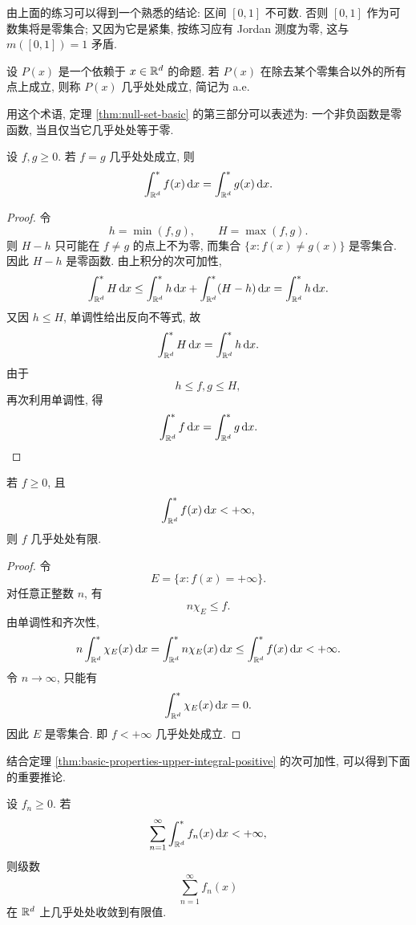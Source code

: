 由上面的练习可以得到一个熟悉的结论: 区间 \([0,1]\) 不可数. 否则 \([0,1]\) 作为可数集将是零集合; 又因为它是紧集, 按练习应有 Jordan 测度为零, 这与 \(m([0,1])=1\) 矛盾.

\begin{defn}[几乎处处]
	\label{def:almost-everywhere}
	设 \(P(x)\) 是一个依赖于 \(x\in\mathbb{R}^d\) 的命题. 若 \(P(x)\) 在除去某个零集合以外的所有点上成立, 则称 \(P(x)\) 几乎处处成立, 简记为 a.e.
\end{defn}

用这个术语, 定理 \ref{thm:null-set-basic} 的第三部分可以表述为: 一个非负函数是零函数, 当且仅当它几乎处处等于零.

\begin{thm}\label{thm:ae-equal-same-upper-integral}
	设 \(f,g\geq0\). 若 \(f=g\) 几乎处处成立, 则
	\[
	\int_{\mathbb{R}^d}^{*}f(x)\,\dd x
	=
	\int_{\mathbb{R}^d}^{*}g(x)\,\dd x.
	\]
\end{thm}

\begin{proof}
	令
	\[
	h=\min(f,g),
	\qquad
	H=\max(f,g).
	\]
	则 \(H-h\) 只可能在 \(f\neq g\) 的点上不为零, 而集合 \(\{x:f(x)\neq g(x)\}\) 是零集合. 因此 \(H-h\) 是零函数. 由上积分的次可加性,
	\[
	\int_{\mathbb{R}^d}^{*}H\,\dd x
	\leq
	\int_{\mathbb{R}^d}^{*}h\,\dd x
	+
	\int_{\mathbb{R}^d}^{*}(H-h)\,\dd x
	=
	\int_{\mathbb{R}^d}^{*}h\,\dd x.
	\]
	又因 \(h\leq H\), 单调性给出反向不等式, 故
	\[
	\int_{\mathbb{R}^d}^{*}H\,\dd x
	=
	\int_{\mathbb{R}^d}^{*}h\,\dd x.
	\]
	由于
	\[
	h\leq f,g\leq H,
	\]
	再次利用单调性, 得
	\[
	\int_{\mathbb{R}^d}^{*}f\,\dd x
	=
	\int_{\mathbb{R}^d}^{*}g\,\dd x.
	\]
\end{proof}

\begin{thm}\label{thm:finite-upper-integral-finite-ae}
	若 \(f\geq0\), 且
	\[
	\int_{\mathbb{R}^d}^{*}f(x)\,\dd x<+\infty,
	\]
	则 \(f\) 几乎处处有限.
\end{thm}

\begin{proof}
	令
	\[
	E=\{x:f(x)=+\infty\}.
	\]
	对任意正整数 \(n\), 有
	\[
	n\chi_E\leq f.
	\]
	由单调性和齐次性,
	\[
	n\int_{\mathbb{R}^d}^{*}\chi_E(x)\,\dd x
	=
	\int_{\mathbb{R}^d}^{*}n\chi_E(x)\,\dd x
	\leq
	\int_{\mathbb{R}^d}^{*}f(x)\,\dd x<+\infty.
	\]
	令 \(n\to\infty\), 只能有
	\[
	\int_{\mathbb{R}^d}^{*}\chi_E(x)\,\dd x=0.
	\]
	因此 \(E\) 是零集合. 即 \(f<+\infty\) 几乎处处成立.
\end{proof}

结合定理 \ref{thm:basic-properties-upper-integral-positive} 的次可加性, 可以得到下面的重要推论.

\begin{cor}\label{cor:summable-integrals-finite-ae}
	设 \(f_n\geq0\). 若
	\[
	\sum_{n=1}^{\infty}\int_{\mathbb{R}^d}^{*}f_n(x)\,\dd x<+\infty,
	\]
	则级数
	\[
	\sum_{n=1}^{\infty}f_n(x)
	\]
	在 \(\mathbb{R}^d\) 上几乎处处收敛到有限值.
\end{cor}

